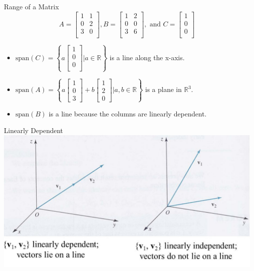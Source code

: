 \documentclass[aspectratio=43]{beamer}
\begin{document}
\begin{frame}{Range of a Matrix}
  $$
    A = \begin{bmatrix}
      1 & 1 \\
      0 & 2 \\
      3 & 0 \\
    \end{bmatrix},
    B = \begin{bmatrix}
      1 & 2 \\
      0 & 0 \\
      3 & 6 \\
    \end{bmatrix}, \text{ and }
    C = \begin{bmatrix}
      1 \\ 0 \\ 0\\
    \end{bmatrix}
  $$
  \begin{itemize}
    \item $\text{span}(C) = \left\{ a \begin{bmatrix}
              1 \\ 0 \\ 0\\
            \end{bmatrix} \vert a \in \mathbb{R} \right\}$ is a line along the x-axis.

    \item $\text{span}(A) = \left\{ a \begin{bmatrix}1 \\ 0 \\ 3 \end{bmatrix} + b \begin{bmatrix}1 \\ 2 \\ 0\end{bmatrix} | a,b \in \mathbb{R} \right\}$ is a plane in $\mathbb{R}^3$.

    \item $\text{span}(B)$ is a line because the columns are linearly dependent.
  \end{itemize}
\end{frame}

\begin{frame}{Linearly Dependent}
  \includegraphics[width= \linewidth]{span_1.png}
\end{frame}
\end{document}

